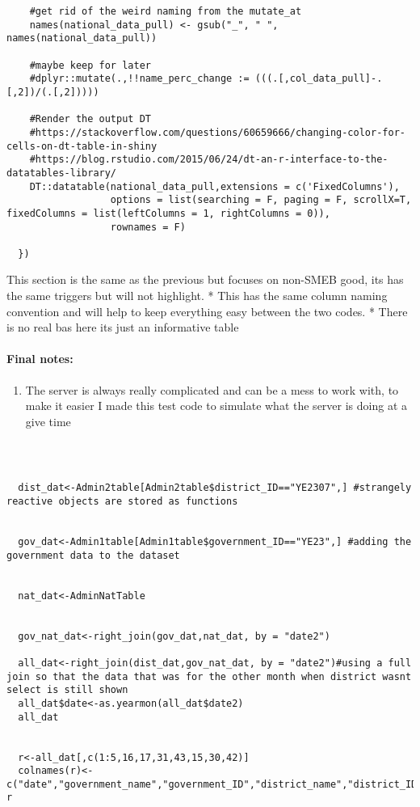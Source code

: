 \documentclass[
]{article}
\providecommand{\tightlist}{%
  \setlength{\itemsep}{0pt}\setlength{\parskip}{0pt}}
\begin{document}
\begin{verbatim}
    #get rid of the weird naming from the mutate_at
    names(national_data_pull) <- gsub("_", " ", names(national_data_pull))
    
    #maybe keep for later
    #dplyr::mutate(.,!!name_perc_change := (((.[,col_data_pull]-.[,2])/(.[,2]))))
    
    #Render the output DT
    #https://stackoverflow.com/questions/60659666/changing-color-for-cells-on-dt-table-in-shiny
    #https://blog.rstudio.com/2015/06/24/dt-an-r-interface-to-the-datatables-library/
    DT::datatable(national_data_pull,extensions = c('FixedColumns'), 
                  options = list(searching = F, paging = F, scrollX=T, fixedColumns = list(leftColumns = 1, rightColumns = 0)),
                  rownames = F)
    
  })
\end{verbatim}

This section is the same as the previous but focuses on non-SMEB good,
its has the same triggers but will not highlight. * This has the same
column naming convention and will help to keep everything easy between
the two codes. * There is no real bas here its just an informative table

\hypertarget{final-notes-2}{%
\paragraph{Final notes:}\label{final-notes-2}}

\begin{enumerate}
\def\labelenumi{\arabic{enumi}.}
\tightlist
\item
  The server is always really complicated and can be a mess to work
  with, to make it easier I made this test code to simulate what the
  server is doing at a give time
\end{enumerate}

\begin{verbatim}



  dist_dat<-Admin2table[Admin2table$district_ID=="YE2307",] #strangely reactive objects are stored as functions


  gov_dat<-Admin1table[Admin1table$government_ID=="YE23",] #adding the government data to the dataset


  nat_dat<-AdminNatTable


  gov_nat_dat<-right_join(gov_dat,nat_dat, by = "date2")

  all_dat<-right_join(dist_dat,gov_nat_dat, by = "date2")#using a full join so that the data that was for the other month when district wasnt select is still shown
  all_dat$date<-as.yearmon(all_dat$date2)
  all_dat

  
  r<-all_dat[,c(1:5,16,17,31,43,15,30,42)]
  colnames(r)<-c("date","government_name","government_ID","district_name","district_ID","variableSEL","date2","governorate_val","nat_val","dist_obs","gov_obs","nat_obs")
r  
  
\end{verbatim}
\end{document}
